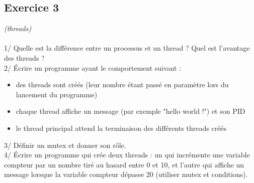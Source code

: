 \documentclass[a4paper,12pt]{article}
\begin{document}
	\subsection*{Exercice 3} 
	\textit{(threads)}
	\\~\\
	1/ Quelle est la différence entre un processus et un thread ? Quel est l'avantage des threads ?\\
	2/ Écrire un programme ayant le comportement suivant :
	\begin{itemize}
		\item des threads sont créés (leur nombre étant passé en paramètre lors du lancement du programme)
		\item chaque thread affiche un message (par exemple "hello world !") et son PID
		\item le thread principal attend la terminaison des différents threads créés
	\end{itemize}
	3/ Définir un mutex et donner son rôle.\\
	4/ Écrire un programme qui crée deux threads : un qui incrémente une variable compteur par un nombre tiré au hasard entre 0 et 10, et l'autre qui affiche un message lorsque la variable compteur dépasse 20 (utiliser mutex et conditions).
\end{document}
